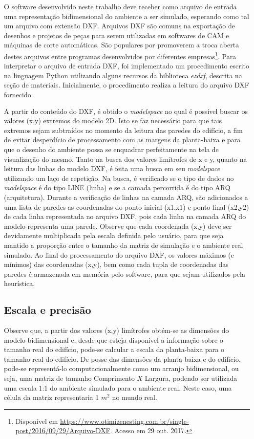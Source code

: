\documentclass[
	12pt,				%
	openright,			%
	twoside,			%
	a4paper,			%
	english,			%
	french,				%
	spanish,			%
	brazil				%
	]{abntex2}
\begin{document}
O software desenvolvido neste trabalho deve receber como arquivo de entrada uma representação bidimensional do ambiente a ser simulado, esperando como tal um arquivo com extensão DXF. Arquivos DXF são comuns na exportação de desenhos e projetos de peças para serem utilizadas em softwares de CAM e máquinas de corte automáticas.  São populares por promoverem a troca aberta destes arquivos entre programas desenvolvidos por diferentes empresas\footnote{Disponível em \url{https://www.otimizenesting.com.br/single-post/2016/09/29/Arquivo-DXF}. Acesso em 29 out. 2017.}. Para interpretar o arquivo de entrada DXF, foi implementado um procedimento escrito na linguagem Python utilizando alguns recursos da biblioteca \textit{ezdxf}, descrita na seção de materiais. Inicialmente, o procedimento realiza a leitura do arquivo DXF fornecido. 

A partir do conteúdo do DXF, é obtido o \textit{modelspace} no qual é possível buscar os valores (x,y) extremos do modelo 2D. Isto se faz necessário para que tais extremos sejam subtraídos no momento da leitura das paredes do edifício, a fim de evitar desperdício de processamento com as margens da planta-baixa e para que o desenho do ambiente possa se enquadrar perfeitamente na tela de visualização do mesmo. Tanto na busca dos valores limítrofes de x e y, quanto na leitura das linhas do modelo DXF, é feita uma busca em seu \textit{modelspace} utilizando um laço de repetição. Na busca, é verificado se o tipo de dados no \textit{modelspace} é do tipo LINE (linha) e se a camada percorrida é do tipo ARQ (arquitetura). Durante a verificação de linhas na camada ARQ, são adicionados a uma lista de paredes as coordenadas do ponto inicial (x1,x1) e ponto final (x2,y2) de cada linha representada no arquivo DXF, pois cada linha na camada ARQ do modelo representa uma parede. Observe que cada coordenada (x,y) deve ser devidamente multiplicada pela escala definida pelo usuário, para que seja mantido a proporção entre o tamanho da matriz de simulação e o ambiente real simulado. Ao final do processamento do arquivo DXF, os valores máximos (e mínimos) das coordenadas (x,y), bem como cada tupla de coordenadas das paredes é armazenada em memória pelo software, para que sejam utilizados pela heurística.


\subsection[Escala e precisão]{Escala e precisão}

Observe que, a partir dos valores (x,y) limítrofes obtém-se as dimensões do modelo bidimensional e, desde que esteja disponível a informação sobre o tamanho real do edifício, pode-se calcular a escala da planta-baixa para o tamanho real do edifício. De posse das dimensões da planta-baixa e do edifício, pode-se representá-lo computacionalmente como um arranjo bidimensional, ou seja, uma matriz de tamanho Comprimento $X$ Largura, podendo ser utilizada uma escala 1:1 do ambiente simulado para o ambiente real. Neste caso, uma célula da matriz representaria 1 $ m^{2} $ no mundo real.
\end{document}
